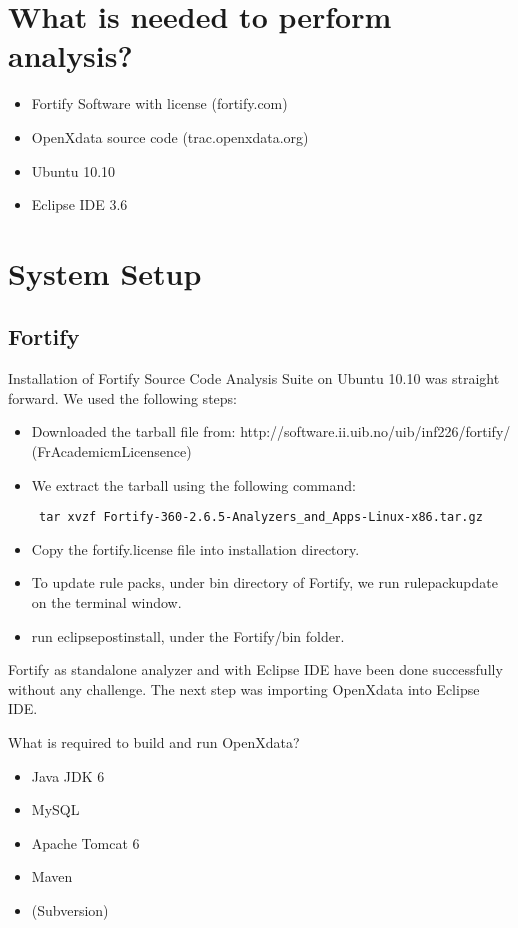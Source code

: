 \documentclass[11pt,a4paper]{article}
\theoremstyle{definition}
\begin{document}
\section{What is needed to perform analysis?}
\begin{itemize}
 \item Fortify Software with license (fortify.com)
 \item OpenXdata source code (trac.openxdata.org)
 \item Ubuntu 10.10
 \item Eclipse IDE 3.6
\end{itemize}

\section{System Setup}

\subsection{Fortify}

Installation of Fortify Source Code Analysis Suite on Ubuntu 10.10 was straight forward. We used the following steps:
\begin{itemize}
 \item Downloaded the tarball file from: http://software.ii.uib.no/uib/inf226/fortify/ (FrAcademicmLicensence)
 \item We extract the tarball using the following command:
 \begin{verbatim} tar xvzf Fortify-360-2.6.5-Analyzers_and_Apps-Linux-x86.tar.gz\end{verbatim}
 \item Copy the fortify.license file into installation directory.
 \item To update rule packs, under bin directory of Fortify, we run rulepackupdate on the terminal window.
 \item run eclipsepostinstall, under the Fortify/bin folder.
\end{itemize}

Fortify as standalone analyzer and with Eclipse IDE have been done successfully without any challenge.
The next step was importing OpenXdata into Eclipse IDE.

What is required to build and run OpenXdata?
\begin{itemize}
 \item Java JDK 6
 \item MySQL
 \item Apache Tomcat 6
 \item Maven
 \item (Subversion)
\end{itemize}
\end{document}
